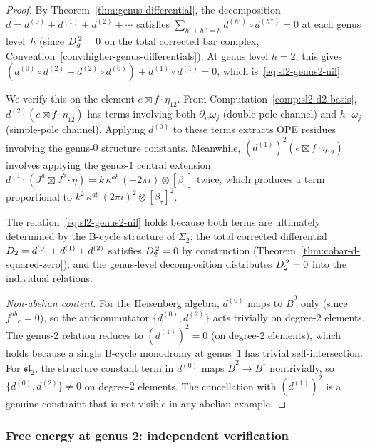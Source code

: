 \begin{proof}
By Theorem~\ref{thm:genus-differential}, the decomposition
$d = d^{(0)} + d^{(1)} + d^{(2)} + \cdots$ satisfies
$\sum_{h'+h''=h} d^{(h')} \circ d^{(h'')} = 0$ at each genus
level~$h$ (since $D_{g}^{\,2} = 0$ on the total corrected bar complex, Convention~\ref{conv:higher-genus-differentials}).
At genus level $h = 2$, this gives
$(d^{(0)} \circ d^{(2)} + d^{(2)} \circ d^{(0)}) + d^{(1)} \circ d^{(1)} = 0$,
which is~\eqref{eq:sl2-genus2-nil}.

We verify this on the element $e \boxtimes f \cdot \eta_{12}$.
From Computation~\ref{comp:sl2-d2-basis},
$d^{(2)}(e \boxtimes f \cdot \eta_{12})$ has
terms involving both $\partial_w\omega_j$ (double-pole channel)
and $h \cdot \omega_j$ (simple-pole channel).  Applying $d^{(0)}$
to these terms extracts OPE residues involving the genus-$0$
structure constants.  Meanwhile, $(d^{(1)})^2(e \boxtimes f \cdot \eta_{12})$
involves applying the genus-$1$ central extension
$d^{(1)}(J^a \boxtimes J^b \cdot \eta)
= k\,\kappa^{ab}\, (-2\pi i) \otimes [\beta_{\tau}]$
twice, which produces a term proportional to
$k^2\,\kappa^{ab}\, (2\pi i)^2 \otimes [\beta_\tau]^2$.

The relation~\eqref{eq:sl2-genus2-nil} holds because both terms are
ultimately determined by the B-cycle structure of $\Sigma_2$:
the total corrected differential $D_{2} = d^{(0)} + d^{(1)} + d^{(2)}$ satisfies
$D_{2}^{\,2} = 0$ by construction (Theorem~\ref{thm:cobar-d-squared-zero}),
and the genus-level decomposition distributes $D_{2}^{\,2} = 0$ into
the individual relations.

\emph{Non-abelian content.}
For the Heisenberg algebra, $d^{(0)}$ maps to
$\bar{B}^0$ only (since $f^{ab}{}_c = 0$), so the anticommutator
$\{d^{(0)}, d^{(2)}\}$ acts trivially on degree-$2$ elements.
The genus-$2$ relation reduces to $(d^{(1)})^2 = 0$
(on degree-$2$ elements), which holds because a single B-cycle
monodromy at genus~$1$ has trivial self-intersection.
For $\mathfrak{sl}_2$, the structure constant term in $d^{(0)}$
maps $\bar{B}^2 \to \bar{B}^1$ nontrivially, so
$\{d^{(0)}, d^{(2)}\} \neq 0$ on degree-$2$ elements.
The cancellation with $(d^{(1)})^2$ is a genuine constraint
that is not visible in any abelian example.
\end{proof}

\subsubsection{Free energy at genus 2: independent verification}


